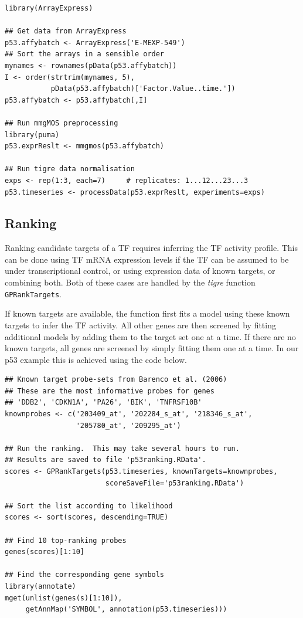 \documentclass[11pt]{article}
\newcommand{\Rpackage}[1]{\emph{#1}}
\newcommand{\tigre}[0]{\Rpackage{tigre}}
\begin{document}
\begin{lstlisting}[frame=single]
library(ArrayExpress)

## Get data from ArrayExpress
p53.affybatch <- ArrayExpress('E-MEXP-549')
## Sort the arrays in a sensible order
mynames <- rownames(pData(p53.affybatch))
I <- order(strtrim(mynames, 5),
           pData(p53.affybatch)['Factor.Value..time.'])
p53.affybatch <- p53.affybatch[,I]

## Run mmgMOS preprocessing
library(puma)
p53.exprReslt <- mmgmos(p53.affybatch)

## Run tigre data normalisation
exps <- rep(1:3, each=7)     # replicates: 1...12...23...3
p53.timeseries <- processData(p53.exprReslt, experiments=exps)
\end{lstlisting}

\subsection{Ranking}

Ranking candidate targets of a TF requires inferring the TF activity
profile.  This can be done using TF mRNA expression levels if the TF
can be assumed to be under transcriptional control, or using
expression data of known targets, or combining both.  Both of these
cases are handled by the \tigre{} function \texttt{GPRankTargets}.

If known targets are available, the function first fits a model using
these known targets to infer the TF activity.  All other genes are
then screened by fitting additional models by adding them to the
target set one at a time.  If there are no known targets, all genes
are screened by simply fitting them one at a time.
In our p53 example this is achieved using the code below.

\begin{lstlisting}[frame=single]
## Known target probe-sets from Barenco et al. (2006)
## These are the most informative probes for genes
## 'DDB2', 'CDKN1A', 'PA26', 'BIK', 'TNFRSF10B'
knownprobes <- c('203409_at', '202284_s_at', '218346_s_at',
                 '205780_at', '209295_at')

## Run the ranking.  This may take several hours to run.
## Results are saved to file 'p53ranking.RData'.
scores <- GPRankTargets(p53.timeseries, knownTargets=knownprobes,
                        scoreSaveFile='p53ranking.RData')

## Sort the list according to likelihood
scores <- sort(scores, descending=TRUE)

## Find 10 top-ranking probes
genes(scores)[1:10]

## Find the corresponding gene symbols
library(annotate)
mget(unlist(genes(s)[1:10]),
     getAnnMap('SYMBOL', annotation(p53.timeseries)))
\end{lstlisting}
\end{document}
